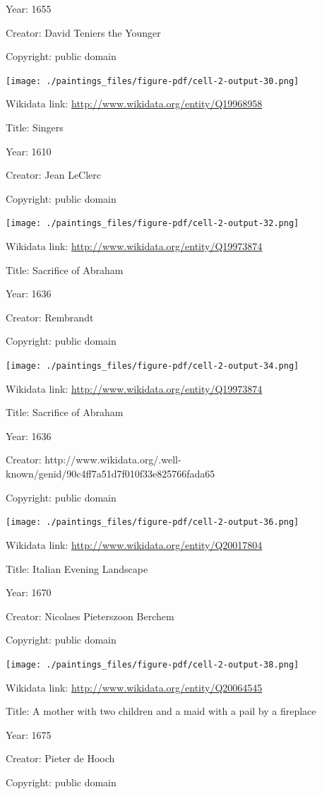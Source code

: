 \documentclass[
  letterpaper,
]{book}
\begin{document}
Year: 1655

Creator: David Teniers the Younger

Copyright: public domain

\texttt{[image: ./paintings\_files/figure-pdf/cell-2-output-30.png]}

Wikidata link: \url{http://www.wikidata.org/entity/Q19968958}

Title: Singers

Year: 1610

Creator: Jean LeClerc

Copyright: public domain

\texttt{[image: ./paintings\_files/figure-pdf/cell-2-output-32.png]}

Wikidata link: \url{http://www.wikidata.org/entity/Q19973874}

Title: Sacrifice of Abraham

Year: 1636

Creator: Rembrandt

Copyright: public domain

\texttt{[image: ./paintings\_files/figure-pdf/cell-2-output-34.png]}

Wikidata link: \url{http://www.wikidata.org/entity/Q19973874}

Title: Sacrifice of Abraham

Year: 1636

Creator:
http://www.wikidata.org/.well-known/genid/90c4ff7a51d7f010f33e825766fada65

Copyright: public domain

\texttt{[image: ./paintings\_files/figure-pdf/cell-2-output-36.png]}

Wikidata link: \url{http://www.wikidata.org/entity/Q20017804}

Title: Italian Evening Landscape

Year: 1670

Creator: Nicolaes Pieterszoon Berchem

Copyright: public domain

\texttt{[image: ./paintings\_files/figure-pdf/cell-2-output-38.png]}

Wikidata link: \url{http://www.wikidata.org/entity/Q20064545}

Title: A mother with two children and a maid with a pail by a fireplace

Year: 1675

Creator: Pieter de Hooch

Copyright: public domain
\end{document}
